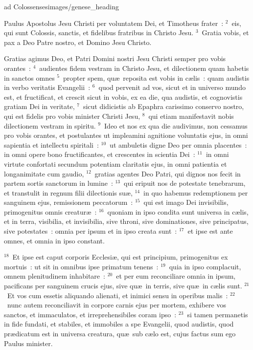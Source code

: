 {ad Colossenses}{images/genese_heading}


\lettrine[lines=10,image=true,loversize=0.05,lraise=-0.03]{P}{}aulus Apostolus Jesu Christi per voluntatem Dei, et Timotheus frater~:
${}^{2}$~eis, qui sunt Colossis, sanctis, et fidelibus fratribus in Christo Jesu.
${}^{3}$~Gratia vobis, et pax a Deo Patre nostro, et Domino Jesu Christo.

 Gratias agimus Deo, et Patri Domini nostri Jesu Christi semper pro vobis orantes~:
${}^{4}$~audientes fidem vestram in Christo Jesu, et dilectionem quam habetis in sanctos omnes
${}^{5}$~propter spem, qu\ae\ reposita est vobis in c\ae lis~: quam audistis in verbo veritatis Evangelii~:
${}^{6}$~quod pervenit ad vos, sicut et in universo mundo est, et fructificat, et crescit sicut in vobis, ex ea die, qua audistis, et cognovistis gratiam Dei in veritate,
${}^{7}$~sicut didicistis ab Epaphra carissimo conservo nostro, qui est fidelis pro vobis minister Christi Jesu,
${}^{8}$~qui etiam manifestavit nobis dilectionem vestram in spiritu.
${}^{9}$~Ideo et nos ex qua die audivimus, non cessamus pro vobis orantes, et postulantes ut impleamini agnitione voluntatis ejus, in omni sapientia et intellectu spiritali~:
${}^{10}$~ut ambuletis digne Deo per omnia placentes~: in omni opere bono fructificantes, et crescentes in scientia Dei~:
${}^{11}$~in omni virtute confortati secundum potentiam claritatis ejus, in omni patientia et longanimitate cum gaudio,
${}^{12}$~gratias agentes Deo Patri, qui dignos nos fecit in partem sortis sanctorum in lumine~:
${}^{13}$~qui eripuit nos de potestate tenebrarum, et transtulit in regnum filii dilectionis su\ae ,
${}^{14}$~in quo habemus redemptionem per sanguinem ejus, remissionem peccatorum~:
${}^{15}$~qui est imago Dei invisibilis, primogenitus omnis creatur\ae~:
${}^{16}$~quoniam in ipso condita sunt universa in c\ae lis, et in terra, visibilia, et invisibilia, sive throni, sive dominationes, sive principatus, sive potestates~: omnia per ipsum et in ipso creata sunt~:
${}^{17}$~et ipse est ante omnes, et omnia in ipso constant.


${}^{18}$~Et ipse est caput corporis Ecclesi\ae , qui est principium, primogenitus ex mortuis~: ut sit in omnibus ipse primatum tenens~:
${}^{19}$~quia in ipso complacuit, omnem plenitudinem inhabitare~:
${}^{20}$~et per eum reconciliare omnia in ipsum, pacificans per sanguinem crucis ejus, sive qu\ae\ in terris, sive qu\ae\ in c\ae lis sunt.
${}^{21}$~Et vos cum essetis aliquando alienati, et inimici sensu in operibus malis~:
${}^{22}$~nunc autem reconciliavit in corpore carnis ejus per mortem, exhibere vos sanctos, et immaculatos, et irreprehensibiles coram ipso~:
${}^{23}$~si tamen permanetis in fide fundati, et stabiles, et immobiles a spe Evangelii, quod audistis, quod pr\ae dicatum est in universa creatura, qu\ae\ sub c\ae lo est, cujus factus sum ego Paulus minister.


